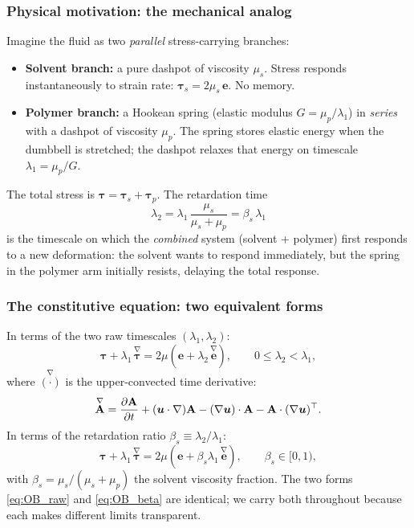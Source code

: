 \subsubsection{Physical motivation: the mechanical analog}

\begin{notebox}
Imagine the fluid as two \emph{parallel} stress-carrying branches:
\begin{itemize}
  \item \textbf{Solvent branch:} a pure dashpot of viscosity $\mu_s$.
        Stress responds instantaneously to strain rate: $\boldsymbol{\tau}_s
        = 2\mu_s\,\mathbf{e}$. No memory.
  \item \textbf{Polymer branch:} a Hookean spring (elastic modulus
        $G = \mu_p/\lambda_1$) in \emph{series} with a dashpot of
        viscosity $\mu_p$. The spring stores elastic energy when the
        dumbbell is stretched; the dashpot relaxes that energy on timescale
        $\lambda_1 = \mu_p/G$.
\end{itemize}
The total stress is $\boldsymbol{\tau} = \boldsymbol{\tau}_s +
\boldsymbol{\tau}_p$. The retardation time
\begin{equation}
  \lambda_2 = \lambda_1\,\frac{\mu_s}{\mu_s + \mu_p} = \beta_s\,\lambda_1
\end{equation}
is the timescale on which the \emph{combined} system (solvent + polymer)
first responds to a new deformation: the solvent wants to respond
immediately, but the spring in the polymer arm initially resists,
delaying the total response.
\end{notebox}

\subsubsection{The constitutive equation: two equivalent forms}

In terms of the two raw timescales $(\lambda_1, \lambda_2)$:
\begin{equation}
  \boldsymbol{\tau} + \lambda_1\,\overset{\nabla}{\boldsymbol{\tau}}
  = 2\mu\!\left(\mathbf{e} + \lambda_2\,\overset{\nabla}{\mathbf{e}}\right),
  \qquad 0 \leq \lambda_2 < \lambda_1,
  \label{eq:OB_raw}
\end{equation}
where $\overset{\nabla}{(\cdot)}$ is the upper-convected time derivative:
\begin{equation}
  \overset{\nabla}{\mathbf{A}}
  = \frac{\partial\mathbf{A}}{\partial t}
  + (\bm{u}\cdot\nabla)\mathbf{A}
  - (\nabla\bm{u})\cdot\mathbf{A}
  - \mathbf{A}\cdot(\nabla\bm{u})^\top.
  \label{eq:ucd}
\end{equation}
In terms of the retardation ratio $\beta_s \equiv \lambda_2/\lambda_1$:
\begin{equation}
  \boldsymbol{\tau} + \lambda_1\,\overset{\nabla}{\boldsymbol{\tau}}
  = 2\mu\!\left(\mathbf{e} + \beta_s\lambda_1\,\overset{\nabla}{\mathbf{e}}\right),
  \qquad \beta_s \in [0,1),
  \label{eq:OB_beta}
\end{equation}
with $\beta_s = \mu_s/(\mu_s+\mu_p)$ the solvent viscosity fraction.
The two forms \eqref{eq:OB_raw} and \eqref{eq:OB_beta} are identical;
we carry both throughout because each makes different limits transparent.

